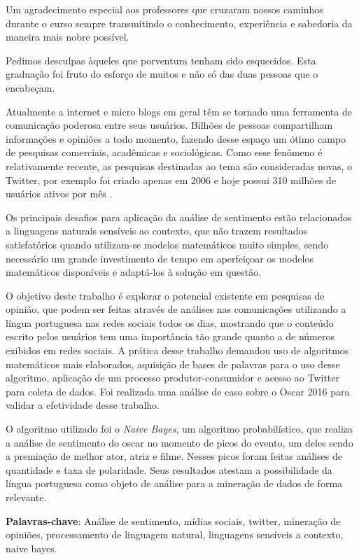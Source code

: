 Um agradecimento especial aos professores que cruzaram nossos caminhos durante o curso sempre transmitindo o conhecimento, experiência e sabedoria da maneira mais nobre possível.

Pedimos desculpas àqueles que porventura tenham sido esquecidos. Esta graduação foi fruto do esforço de muitos e não só das duas pessoas que o encabeçam.
\begin{resumo}

Atualmente a internet e micro blogs em geral têm se tornado uma ferramenta de comunicação poderosa entre seus usuários. Bilhões de pessoas compartilham informações e opiniões a todo momento, fazendo desse espaço um ótimo campo de pesquisas comerciais, acadêmicas e sociológicas.  Como esse fenômeno é relativamente recente, as pesquisas destinadas ao tema são consideradas novas, o Twitter, por exemplo foi criado apenas em 2006 e hoje possui 310 milhões de usuários ativos por mês .


Os principais desafios para aplicação da análise de sentimento estão relacionados a linguagens naturais sensíveis ao contexto, que não trazem resultados satisfatórios quando utilizam-se modelos matemáticos muito simples, sendo necessário um grande investimento de tempo em aperfeiçoar os modelos matemáticos disponíveis e adaptá-los à solução em questão.


O objetivo deste trabalho é explorar o potencial existente em pesquisas de opinião,  que podem ser feitas através de análises nas comunicações utilizando a  língua portuguesa nas redes sociais todos os dias, mostrando que o conteúdo escrito pelos usuários tem uma importância tão grande quanto a de números exibidos em redes sociais. A prática desse trabalho demandou uso de algoritmos matemáticos mais elaborados, aquisição de bases de palavras para o uso desse algoritmo, aplicação de um processo produtor-consumidor e acesso ao Twitter para coleta de dados. Foi realizada uma análise de caso sobre o Oscar 2016 para validar a efetividade desse trabalho. 


O algoritmo utilizado foi o \textit{Naive Bayes}, um algoritmo probabilístico, que realiza a análise de sentimento do oscar no momento de picos do evento, um deles sendo a premiação de melhor ator, atriz e filme. Nesses picos foram feitas análises de quantidade  e  taxa de polaridade. Seus resultados atestam a possibilidade da língua portuguesa como objeto de análise para a mineração de dados de forma relevante.


{\hspace{-8mm} \bf{Palavras-chave}}: Análise de sentimento, mídias sociais, twitter, mineração de opiniões, processamento de linguagem natural, linguagens sensíveis a contexto, naive bayes.

\acresetall

\end{resumo}

